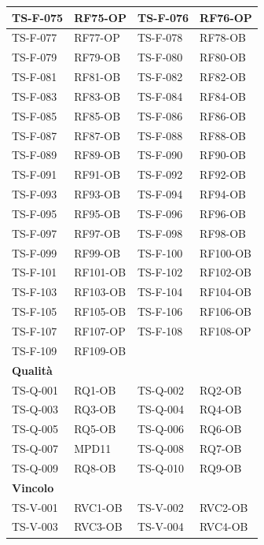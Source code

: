 \documentclass[a4paper,12pt]{article}
\begin{document}
{\begin{longtable}{|p{2.5cm}|p{2.2cm}|p{2.5cm}|p{2.2cm}|}
    \hline
    TS-F-075 & RF75-OP & TS-F-076 & RF76-OP \\
    \hline
    TS-F-077 & RF77-OP & TS-F-078 & RF78-OB \\
    \hline
    TS-F-079 & RF79-OB & TS-F-080 & RF80-OB \\
    \hline
    TS-F-081 & RF81-OB & TS-F-082 & RF82-OB \\
    \hline
    TS-F-083 & RF83-OB & TS-F-084 & RF84-OB \\
    \hline
    TS-F-085 & RF85-OB & TS-F-086 & RF86-OB \\
    \hline
    TS-F-087 & RF87-OB & TS-F-088 & RF88-OB \\
    \hline
    TS-F-089 & RF89-OB & TS-F-090 & RF90-OB \\
    \hline
    TS-F-091 & RF91-OB & TS-F-092 & RF92-OB \\
    \hline
    TS-F-093 & RF93-OB & TS-F-094 & RF94-OB \\
    \hline
    TS-F-095 & RF95-OB & TS-F-096 & RF96-OB \\
    \hline
    TS-F-097 & RF97-OB & TS-F-098 & RF98-OB \\
    \hline
    TS-F-099 & RF99-OB & TS-F-100 & RF100-OB \\
    \hline
    TS-F-101 & RF101-OB & TS-F-102 & RF102-OB \\
    \hline
    TS-F-103 & RF103-OB & TS-F-104 & RF104-OB \\
    \hline
    TS-F-105 & RF105-OB & TS-F-106 & RF106-OB \\
    \hline
    TS-F-107 & RF107-OP & TS-F-108 & RF108-OP \\
    \hline
    TS-F-109 & RF109-OB & & \\
    \hline
    \multicolumn{4}{|l|}{\cellcolor{gray!12}\textbf{Qualità}} \\
    \hline
    TS-Q-001 & RQ1-OB & TS-Q-002 & RQ2-OB \\
    \hline
    TS-Q-003 & RQ3-OB & TS-Q-004 & RQ4-OB \\
    \hline
    TS-Q-005 & RQ5-OB & TS-Q-006 & RQ6-OB \\
    \hline
    TS-Q-007 & MPD11  & TS-Q-008 & RQ7-OB \\
    \hline
    TS-Q-009 & RQ8-OB  & TS-Q-010 & RQ9-OB \\
    \hline
    \multicolumn{4}{|l|}{\cellcolor{gray!12}\textbf{Vincolo}} \\
    \hline
    TS-V-001 & RVC1-OB & TS-V-002 & RVC2-OB \\
    \hline
    TS-V-003 & RVC3-OB & TS-V-004 & RVC4-OB \\

\end{longtable}}
\end{document}
